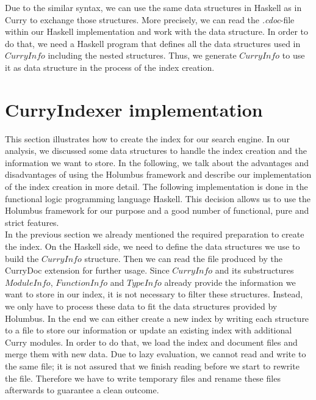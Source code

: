 \documentclass[%
	pdftex,%
	a4paper,%
	oneside,%
	chapterprefix,%
	headsepline,%
	12pt%
]{scrbook}
\newcommand{\Conid}[1]{\mathit{#1}}
\begin{document}
Due to the similar syntax, we can use the same data structures in
Haskell as in Curry to exchange those structures. %
More precisely, we can read the \emph{.cdoc}-file within our Haskell
implementation and work with the data structure. %
In order to do that, we need a Haskell program that defines all the
data structures used in \ensuremath{\Conid{CurryInfo}} including the nested structures. %
Thus, we generate \ensuremath{\Conid{CurryInfo}} to use it as data structure in the
process of the index creation.

\section{CurryIndexer implementation}\label{implementation:index}

This section illustrates how to create the index for our search
engine. %
In our analysis, we discussed some data structures to handle the index
creation and the information we want to store. %
In the following, we talk about the advantages and disadvantages of
using the Holumbus framework and describe our implementation of the
index creation in more detail. %
The following implementation is done in the functional logic
programming language Haskell. %
This decision allows us to use the Holumbus framework for our purpose
and a good number of functional, pure and strict features.\\

In the previous section we already mentioned the required preparation
to create the index. %
On the Haskell side, we need to define the data structures we use to
build the \ensuremath{\Conid{CurryInfo}} structure. %
Then we can read the file produced by the CurryDoc extension for
further usage. %
Since \ensuremath{\Conid{CurryInfo}} and its substructures \ensuremath{\Conid{ModuleInfo}}, \ensuremath{\Conid{FunctionInfo}}
and \ensuremath{\Conid{TypeInfo}} already provide the information we want to store in our
index, it is not necessary to filter these structures. %
Instead, we only have to process these data to fit the data structures
provided by Holumbus. %
In the end we can either create a new index by writing each structure
to a file to store our information or update an existing index with
additional Curry modules. %
In order to do that, we load the index and document files and merge
them with new data. %
Due to lazy evaluation, we cannot read and write to the same file; it
is not assured that we finish reading before we start to rewrite the
file. %
Therefore we have to write temporary files and rename these files
afterwards to guarantee a clean outcome.
\end{document}
